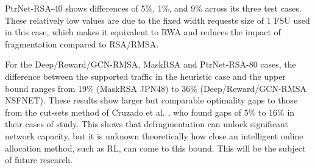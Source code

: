 PtrNet-RSA-40 shows differences of 5\%, 1\%, and 9\% across its three test cases. These relatively low values are due to the fixed width requests size of 1 FSU used in this case, which makes it equivalent to RWA and reduces the impact of fragmentation compared to RSA/RMSA.

For the Deep/Reward/GCN-RMSA, MaskRSA and PtrNet-RSA-80 cases, the difference between the supported traffic in the heuristic case and the upper bound ranges from 19\% (MaskRSA JPN48) to 36\% (Deep/Reward/GCN-RMSA NSFNET). These results show larger but comparable optimality gaps to those from the cut-sets method of Cruzado et al. \cite{cruzado_capacity-bound_2024}, who found gaps of 5\% to 16\% in their cases of study. This shows that defragmentation can unlock significant network capacity, but it is unknown theoretically how close an intelligent online allocation method, such as RL, can come to this bound. This will be the subject of future research.
